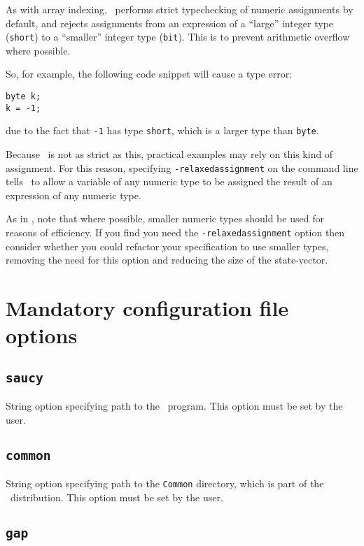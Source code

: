 As with array indexing, \topspin\ performs strict typechecking of numeric assignments by default, and rejects assignments from an expression
of a ``large'' integer type (\eg \texttt{short}) to a ``smaller'' integer type (\eg \texttt{bit}).  This is to prevent arithmetic overflow
where possible.

So, for example, the following code snippet will cause a type error:

\begin{lstlisting}
byte k;
k = -1;
\end{lstlisting}

\noindent due to the fact that \texttt{-1} has type \texttt{short}, which is a larger type than \texttt{byte}.

Because \spin\ is not as strict as this, practical examples may rely on this kind of assignment.  For this reason, specifying
\texttt{-relaxedassignment} on the command line tells \topspin\ to allow a variable of any numeric type to be assigned the result
of an expression of any numeric type.

As in , note that where possible, smaller numeric types should be used for reasons of efficiency.  If you find you need the
\texttt{-relaxedassignment} option then consider whether you could refactor your specification to use smaller types, removing the need
for this option and reducing the size of the state-vector.

\section{Mandatory configuration file options}

\subsection{\texttt{saucy}}

String option specifying path to the \saucy\ program.  This option must be set by the user.

\subsection{\texttt{common}}

String option specifying path to the \texttt{Common} directory, which is part of the \topspin\ distribution.  This option must be set by the user.

\subsection{\texttt{gap}}

